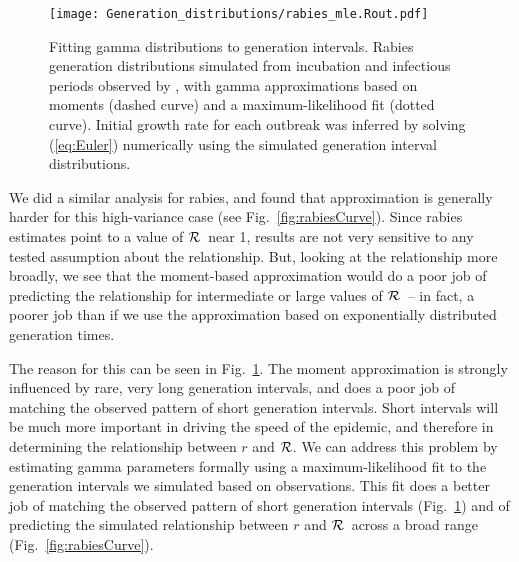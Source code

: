 \documentclass[12pt]{article}
\newcommand{\RR}{\ensuremath{{\cal R}}}
\newcommand{\eref}[1]{(\ref{eq:#1})}
\newcommand{\fref}[1]{Fig.~\ref{fig:#1}}
\begin{document}
\begin{figure}[htbp] \centering
	\texttt{[image: Generation\_distributions/rabies\_mle.Rout.pdf]}
	\caption{
		Fitting gamma distributions to generation intervals. 
		Rabies generation distributions simulated from incubation and infectious periods observed by \cite{HampDush09}, with gamma approximations based on moments (dashed curve) and a maximum-likelihood fit (dotted curve). Initial growth rate for each outbreak was inferred by solving \eref{Euler} numerically using the simulated generation interval distributions.
	}
	\label{fig:rabiesHist}
\end{figure}

We did a similar analysis for rabies, and found that approximation is generally harder for this high-variance case (see \fref{rabiesCurve}). Since rabies estimates point to a value of \RR\ near 1, results are not very sensitive to any tested assumption about the relationship. But, looking at the relationship more broadly, we see that the moment-based approximation would do a poor job of predicting the relationship for intermediate or large values of \RR\ -- in fact, a poorer job than if we use the approximation based on exponentially distributed generation times. 

The reason for this can be seen in \fref{rabiesHist}. The moment approximation is strongly influenced by rare, very long generation intervals, and does a poor job of matching the observed pattern of short generation intervals. Short intervals will be much more important in driving the speed of the epidemic, and therefore in determining the relationship between $r$ and \RR. We can address this problem by estimating gamma parameters formally using a maximum-likelihood fit to the generation intervals we simulated based on observations. This fit does a better job of matching the observed pattern of short generation intervals (\fref{rabiesHist}) and of predicting the simulated relationship between $r$ and \RR\ across a broad range (\fref{rabiesCurve}).
\end{document}
